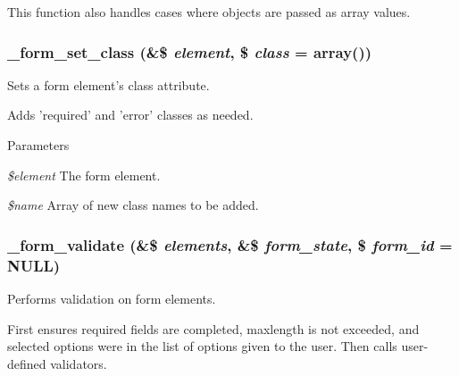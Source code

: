 This function also handles cases where objects are passed as array values. \hypertarget{group__form__api_gac8800bdf25db7c100ccf2fd0dcbb25f0}{
\subsubsection[{\_\-form\_\-set\_\-class}]{\setlength{\rightskip}{0pt plus 5cm}\_\-form\_\-set\_\-class (\&\$ {\em element}, \/  \$ {\em class} = {\ttfamily array()})}}
\label{group__form__api_gac8800bdf25db7c100ccf2fd0dcbb25f0}
Sets a form element's class attribute.

Adds 'required' and 'error' classes as needed.


\begin{DoxyParams}{Parameters}
\item[{\em \$element}]The form element. \item[{\em \$name}]Array of new class names to be added. \end{DoxyParams}
\hypertarget{group__form__api_ga464b4724506722d2a2d482df27736357}{
\subsubsection[{\_\-form\_\-validate}]{\setlength{\rightskip}{0pt plus 5cm}\_\-form\_\-validate (\&\$ {\em elements}, \/  \&\$ {\em form\_\-state}, \/  \$ {\em form\_\-id} = {\ttfamily NULL})}}
\label{group__form__api_ga464b4724506722d2a2d482df27736357}
Performs validation on form elements.

First ensures required fields are completed, maxlength is not exceeded, and selected options were in the list of options given to the user. Then calls user-\/defined validators.



